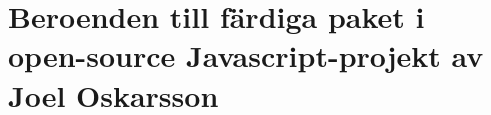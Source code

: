\chapter{Beroenden till färdiga paket i open-source Javascript-projekt av Joel Oskarsson}
\label{individual:joel_o}







